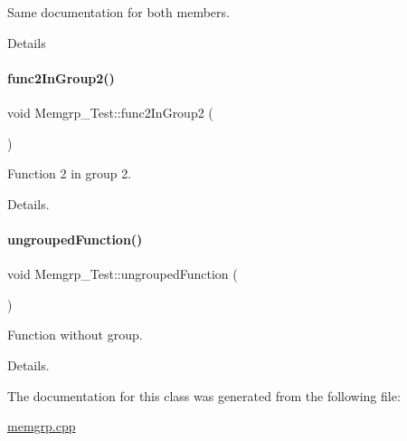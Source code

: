Same documentation for both members. 

Details \hypertarget{class_memgrp___test_a9ce862049bb543596343e81ad3ddddff}{}\label{class_memgrp___test_a9ce862049bb543596343e81ad3ddddff} 
\paragraph{\texorpdfstring{func2\+In\+Group2()}{func2InGroup2()}}
{\footnotesize\ttfamily void Memgrp\+\_\+\+Test\+::func2\+In\+Group2 (\begin{DoxyParamCaption}{ }\end{DoxyParamCaption})\hspace{0.3cm}{\ttfamily [protected]}}



Function 2 in group 2. 

Details. \hypertarget{class_memgrp___test_a8a3a4ac34b2e25696159ac420bd4bdc6}{}\label{class_memgrp___test_a8a3a4ac34b2e25696159ac420bd4bdc6} 
\paragraph{\texorpdfstring{ungrouped\+Function()}{ungroupedFunction()}}
{\footnotesize\ttfamily void Memgrp\+\_\+\+Test\+::ungrouped\+Function (\begin{DoxyParamCaption}{ }\end{DoxyParamCaption})}



Function without group. 

Details. 

The documentation for this class was generated from the following file\+:\begin{DoxyCompactItemize}
\item 
\hyperlink{memgrp_8cpp}{memgrp.\+cpp}\end{DoxyCompactItemize}

